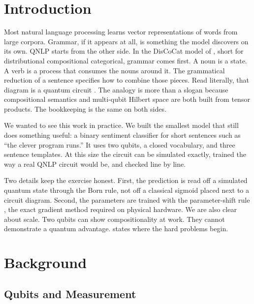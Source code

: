 \documentclass{article}
\begin{document}
\section{Introduction}
\label{sec:intro}

Most natural language processing learns vector representations of words from
large corpora. Grammar, if it appears at all, is something the model discovers
on its own. QNLP starts from the other side. In the DisCoCat model of
\citet{coecke2010mathematical}, short for distributional compositional
categorical, grammar comes first. A noun is a state. A verb is a process that
consumes the nouns around it. The grammatical reduction of a sentence specifies
how to combine those pieces. Read literally, that diagram is a quantum circuit
\citep{coecke2020foundations}. The analogy is more than a slogan because
compositional semantics and multi-qubit Hilbert space are both built from tensor
products. The bookkeeping is the same on both sides.

We wanted to see this work in practice. We built the smallest model that still
does something useful: a binary sentiment classifier for short sentences such as
``the clever program runs.'' It uses two qubits, a closed vocabulary, and three
sentence templates. At this size the circuit can be simulated exactly, trained
the way a real QNLP circuit would be, and checked line by line.

Two details keep the exercise honest. First, the prediction is read off a
simulated quantum state through the Born rule, not off a classical sigmoid placed
next to a circuit diagram. Second, the parameters are trained with the
parameter-shift rule \citep{mitarai2018quantum,schuld2019evaluating}, the exact
gradient method required on physical hardware. We are also clear about scale. Two
qubits can show compositionality at work. They cannot demonstrate a quantum
advantage.  states where the hard problems begin.

\section{Background}
\label{sec:background}

\subsection{Qubits and Measurement}
\end{document}
